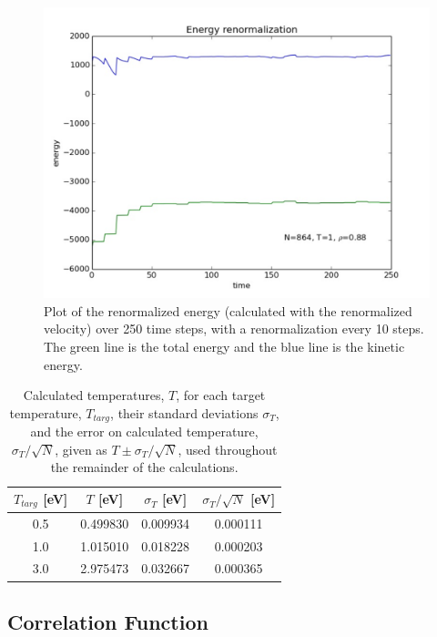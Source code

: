 \documentclass{article}
\begin{document}
\begin{multicols}{2}
\begin{figure}[H]
\begin{center}
\includegraphics[width=\linewidth]{plots/renormalizationshorttimerange.pdf}
\caption{Plot of the renormalized energy (calculated with the renormalized velocity) over 250 time steps, with a renormalization every 10 steps.  The green line is the total energy and the blue line is the kinetic energy.}
\label{engrenorm}
\end{center}
\end{figure}

\begin{table}
\begin{center}
\begin{tabular}{| c | c | c | c |}
\hline $T_{targ}$ [eV] & $T$ [eV] & $\sigma_T$ [eV] & $\sigma_T/\sqrt{N}$ [eV] \\ \hline
 0.5 & 0.499830 & 0.009934 & 0.000111 \\ \hline
1.0 & 1.015010 & 0.018228 & 0.000203  \\ \hline
3.0 & 2.975473 & 0.032667 & 0.000365 \\ \hline
\end{tabular}
\label{temptable}
\caption{Calculated temperatures, $T$, for each target temperature, $T_{targ}$, their standard deviations $\sigma _T$, and the error on calculated temperature, $\sigma _T/\sqrt{N}$, given as $T \pm \sigma_T /\sqrt{N}$, used throughout the remainder of the calculations.}
\end{center}
\end{table}


\subsection{Correlation Function}


\end{multicols}
\end{document}
